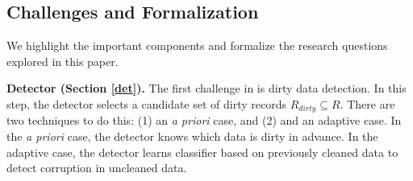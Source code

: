 \iffalse
  \noindent To summarize in pseudocode:
  \begin{enumerate}[leftmargin=1em]\scriptsize\sloppy
  \item \texttt{Init(dirty\_data, cleaned\_data, dirty\_model, batch, iter)}
  \item For each t in $\{1,...,T\}$
  \begin{enumerate}
    \item \texttt{dirty\_sample $=$ sampler(dirty\_data, sample\_prob, detector, batch)}
    \item \texttt{clean\_sample $=$ Cleaner(dirty\_sample)}
    \item \texttt{current\_model $=$ Update(current\_model, sample\_prob, clean\_sample)}
    \item \texttt{cleaned\_data = cleaned\_data + clean\_sample}
    \item \texttt{dirty\_data = dirty\_data - clean\_sample}
    \item \texttt{sample\_prob $=$ Estimator(dirty\_data, cleaned\_data, detector)}
    \item \texttt{detector $=$ DetectorUpdater(detector, cleaned\_data)}
  \end{enumerate}
  \item \texttt{Output: current\_model}
  \end{enumerate}
\fi


\iffalse
  \subsection{Challenges and Formalization}
  We highlight the important components and formalize the research questions explored in this paper. 

  \vspace{0.5em}

  \noindent\textbf{Detector (Section \ref{det}). } The first challenge in \sys is dirty data detection. In this step, the detector selects a candidate set of dirty records $R_{dirty} \subseteq R$. There are two techniques to do this: (1) an \emph{a priori} case, and (2) and an adaptive case. In the \emph{a priori} case, the detector knows which data is dirty in advance. In the adaptive case, the detector learns classifier based on previously cleaned data to detect corruption in uncleaned data.

  \vspace{0.5em}



  \vspace{0.5em}



